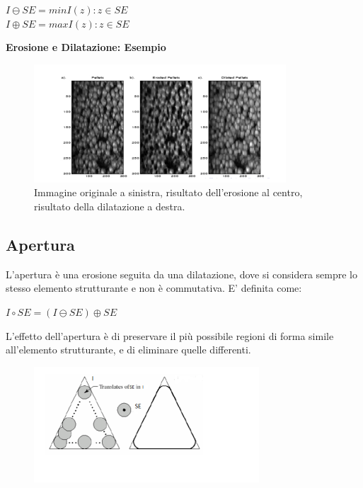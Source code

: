 \begin{center}
    $I \ominus SE = min{I(z):z \in SE}$
    \\$I \oplus SE = max{I(z):z \in SE}$
\end{center}
\textbf{Erosione e Dilatazione: Esempio}

\begin{figure}[H]
    \centering
    \includegraphics[width=\linewidth, keepaspectratio]{capitoli/immagini/imgs/erosione-dilatazione-esempio.png}
    \caption*{Immagine originale a sinistra, risultato dell'erosione al centro, risultato della dilatazione a destra.}
\end{figure}

\subsection{Apertura}
L'apertura è una erosione seguita da una dilatazione, dove si considera sempre lo stesso elemento strutturante e non è commutativa.
E' definita come:

\begin{center}
    $I \circ SE = (I \ominus SE) \oplus SE$
\end{center}

L'effetto dell'apertura è di preservare il più possibile regioni di
forma simile all'elemento strutturante, e di eliminare quelle
differenti.

\begin{figure}[H]
    \centering
    \includegraphics[width=\linewidth, keepaspectratio]{capitoli/immagini/imgs/apertura.png}
\end{figure}

